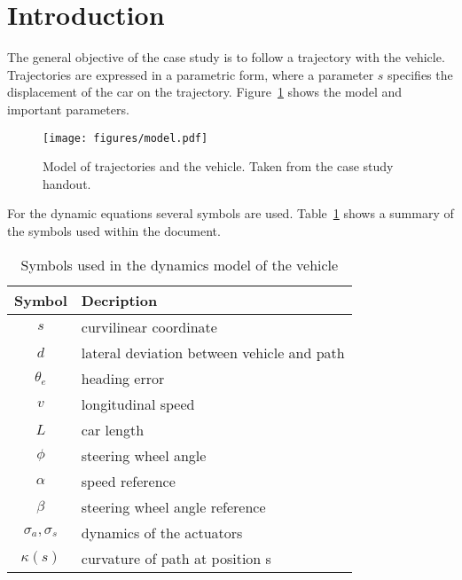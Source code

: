 \section{Introduction}
The general objective of the case study is to follow a trajectory with the vehicle.
Trajectories are expressed in a parametric form, where a parameter $s$ specifies the displacement of the car on the trajectory.
Figure~\ref{fig:vehicle_model} shows the model and important parameters.

\begin{figure}[h]
	\centering
	\texttt{[image: figures/model.pdf]}
	\caption{Model of trajectories and the vehicle. Taken from the case study handout.}
	\label{fig:vehicle_model}
\end{figure}
For the dynamic equations several symbols are used. 
Table~\ref{tab:symbols} shows a summary of the symbols used within the document.
\begin{table}[h]
	\centering
	\begin{tabular}{c|l}
	\hline
	\hline
	\textbf{Symbol} & \textbf{Decription}\\
	\hline
		 $s$ & curvilinear coordinate\\
		 $d$ & lateral deviation between vehicle and path\\
		 $\theta_e$ & heading error\\
		 $v$ & longitudinal speed\\
		 $L$ & car length\\
		 $\phi$ & steering wheel angle\\
		 $\alpha$ & speed reference\\
		 $\beta$ & steering wheel angle reference\\
		 $\sigma_a, \sigma_s$ & dynamics of the actuators\\
		 $\kappa(s)$ & curvature of path at position s\\
	\hline
	\hline
	\end{tabular}
	\caption{Symbols used in the dynamics model of the vehicle}
	\label{tab:symbols}
\end{table}

